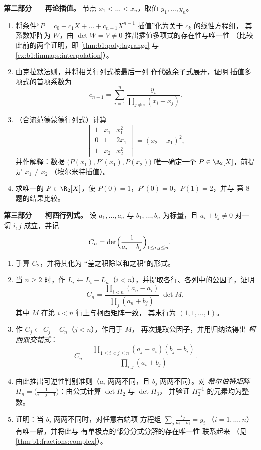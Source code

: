 \begin{problem}
\medskip
\noindent\textbf{第二部分 --- 再论插值。} 节点
$x_1 < \dots < x_n$，取值 $y_1, \dots, y_n$。
\begin{enumerate}[resume]
  \item 将条件“$P = c_0 + c_1X + \dots +
        c_{n-1}X^{n-1}$ 插值”化为关于 $c_k$ 的线性方程组，
        其系数矩阵为 $W$，由 $\det W = V \neq
        0$ 推出插值多项式的存在性与唯一性
        （比较此前的两个证明，即
        \cref{thm:b1:poly:lagrange} 与
        \cref{ex:b1:linmaps:interpolation}）。
  \item 由克拉默法则，并将相关行列式按最后一列
        作代数余子式展开，证明
        插值多项式的首项系数为
        \[
        c_{n-1} = \sum_{i=1}^{n}
        \frac{y_i}{\prod_{j \neq i}(x_i - x_j)} .
        \]
  \item （合流范德蒙德行列式）计算
        \[
        \begin{vmatrix}
        1 & x_1 & x_1^2\\
        0 & 1 & 2x_1\\
        1 & x_2 & x_2^2
        \end{vmatrix}
        = (x_2 - x_1)^2 ,
        \]
        并作解释：数据 $\bigl(P(x_1), P'(x_1),
        P(x_2)\bigr)$ 唯一确定一个 $P \in \R_2[X]$，前提是 $x_1 \neq x_2$
        （埃尔米特插值）。
  \item 求唯一的 $P \in \R_2[X]$，使 $P(0) = 1$，$P'(0)
        = 0$，$P(1) = 2$，并与
        第 8 题的结果比较。
\end{enumerate}

\medskip
\noindent\textbf{第三部分 --- 柯西行列式。} 设 $a_1,
\dots, a_n$ 与 $b_1, \dots, b_n$ 为标量，且 $a_i + b_j
\neq 0$ 对一切 $i, j$ 成立，并记
\[
C_n = \det\Bigl(\frac{1}{a_i + b_j}\Bigr)_{1 \leq i, j \leq n} .
\]
\begin{enumerate}[resume]
  \item 手算 $C_2$，并将其化为
        “差之积除以和之积”的形式。
  \item 当 $n \geq 2$ 时，作 $L_i \leftarrow L_i - L_n$（$i <
        n$），并提取各行、各列中的公因子，证明
        \[
        C_n = \frac{\prod_{i<n}(a_n - a_i)}{\prod_{j}(a_n +
        b_j)}\;\det M,
        \]
        其中 $M$ 在第 $i < n$ 行上与柯西矩阵一致，
        其末行为 $(1, 1, \dots, 1)$。
  \item 作 $C_j \leftarrow C_j - C_n$（$j < n$），作用于 $M$，
        再次提取公因子，并用归纳法得出
        \emph{柯西双交错式}：
        \[
        C_n = \frac{\prod_{1 \leq i < j \leq n}(a_j - a_i)(b_j -
        b_i)}{\prod_{i, j}(a_i + b_j)} .
        \]
  \item 由此推出可逆性判别准则（$a_i$ 两两不同，且
        $b_j$ 两两不同）。对
        \emph{希尔伯特矩阵} $H_n = \bigl(\frac{1}{i + j -
        1}\bigr)$：由公式计算 $\det H_2$ 与 $\det H_3$，
        并验证 $H_2^{-1}$ 的元素均为整数。
  \item 证明：当 $b_j$ 两两不同时，对任意右端项
        方程组 $\sum_j \frac{c_j}{a_i + b_j} = y_i$
        （$i = 1, \dots, n$）有唯一解，并将此与
        有单极点的部分分式分解的存在唯一性
        联系起来
        （见\cref{thm:b1:fractions:complex}）。
\end{enumerate}


\end{problem}
